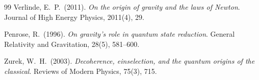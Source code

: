\documentclass[12pt,a4paper]{article}
\theoremstyle{plain}
\theoremstyle{definition}
\begin{document}
\begin{thebibliography}{99}
Verlinde, E.~P.\ (2011).
\emph{On the origin of gravity and the laws of Newton}.
Journal of High Energy Physics, 2011(4), 29.

Penrose, R.\ (1996).
\emph{On gravity's role in quantum state reduction}.
General Relativity and Gravitation, 28(5), 581--600.

Zurek, W.~H.\ (2003).
\emph{Decoherence, einselection, and the quantum origins of the classical}.
Reviews of Modern Physics, 75(3), 715.

\end{thebibliography}
\end{document}
